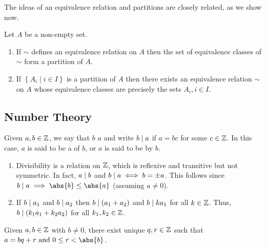 The ideas of an equivalence relation and partitions are closely related, as we show now.

\begin{prop} \label{prop:equivalence-partition}
    Let $A$ be a non-empty set.
    \begin{enumerate}
        \item If $\sim$ defines an equivalence relation on $A$ then the set of equivalence classes of $\sim$ form a partition of $A$.
        \item If $\left\{ A_i \mid i \in I \right\}$ is a partition of $A$ then there exists an equivalence relation $\sim$ on $A$ whose equivalence classes are precisely the sets $A_i, i \in I$.
    \end{enumerate}
\end{prop}

\subsection{Number Theory}

\begin{defn}
    Given $a,b \in \mathbb{Z}$, we say that $b$  $a$ and write $b \mid a$ if $a = bc$ for some $c \in \mathbb{Z}$. In this case, $a$ is said to be a  of $b$, or $a$ is said to be  by $b$.
\end{defn}

\begin{enumerate}
    \item Divisibility is a relation on $\mathbb{Z}$, which is reflexive and transitive but not symmetric. In fact, $a \mid b$ and $b \mid a \iff b = \pm a$. This follows since $b \divides a \implies \abs{b} \leq \abs{a}$ (assuming $a \neq 0$).
    \item If $b \mid a_1$ and $b \mid a_2$ then $b \mid (a_1 + a_2)$ and $b \mid ka_1$ for all $k \in \mathbb{Z}$. Thus, $b \mid (k_1a_1 + k_2a_2)$ for all $k_1,k_2 \in \mathbb{Z}$.
\end{enumerate}

\begin{prop} \label{prop:div_algo}
    Given $a,b \in \mathbb{Z}$ with $b \neq 0$, there exist unique $q,r \in \mathbb{Z}$ such that $a = bq + r \text{ and } 0 \leq r < \abs{b}$.
\end{prop}

